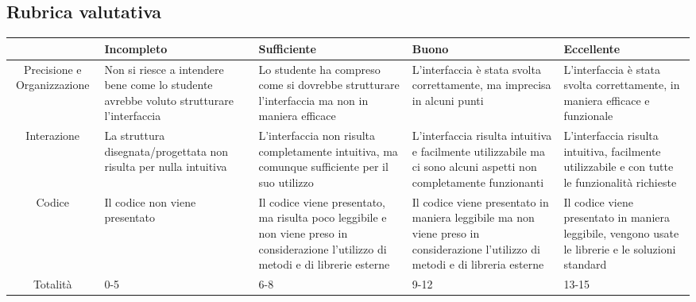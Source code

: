   \subsection{Rubrica valutativa}
  \begin{center}
    \begin{tabular}{|c|p{2.5cm}|p{2.5cm}|p{2.5cm}|p{2.5cm}|}
      \hline
      & Incompleto & Sufficiente & Buono & Eccellente \\
      \hline
      Precisione e Organizzazione & Non si riesce a intendere bene come lo studente avrebbe voluto strutturare l'interfaccia & Lo studente ha compreso come si dovrebbe strutturare l'interfaccia ma non in maniera efficace & L'interfaccia è stata svolta correttamente, ma imprecisa in alcuni punti & L'interfaccia è stata svolta correttamente, in maniera efficace e funzionale \\
      \hline
      Interazione & La struttura disegnata/progettata non risulta per nulla intuitiva & L'interfaccia non risulta completamente intuitiva, ma comunque sufficiente per il suo utilizzo & L'interfaccia risulta intuitiva e facilmente utilizzabile ma ci sono alcuni aspetti non completamente funzionanti & L'interfaccia risulta intuitiva, facilmente utilizzabile e con tutte le funzionalità richieste \\
      \hline
      Codice & Il codice non viene presentato & Il codice viene presentato, ma risulta poco leggibile e non viene preso in considerazione l'utilizzo di metodi e di librerie esterne & Il codice viene presentato in maniera leggibile ma non viene preso in considerazione l'utilizzo di metodi e di libreria esterne & Il codice viene presentato in maniera leggibile, vengono usate le librerie e le soluzioni standard \\
      \hline
      Totalità & 0-5 & 6-8 & 9-12 & 13-15 \\
      \hline
    \end{tabular}
    \end{center}
